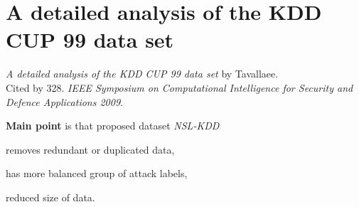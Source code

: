 \section{A detailed analysis of the KDD CUP 99 data set}
\label{ch:tavallaee2009}

\textit{A detailed analysis of the KDD CUP 99 data set} by Tavallaee. \\
Cited by 328. \textit{IEEE Symposium on Computational Intelligence for Security and Defence Applications 2009}.
\newline

\textbf{Main point} is that proposed dataset \textit{NSL-KDD} \begin{inparaenum}
\item removes redundant or duplicated data,
\item has more balanced group of attack labels,
\item reduced size of data.
\end{inparaenum}

